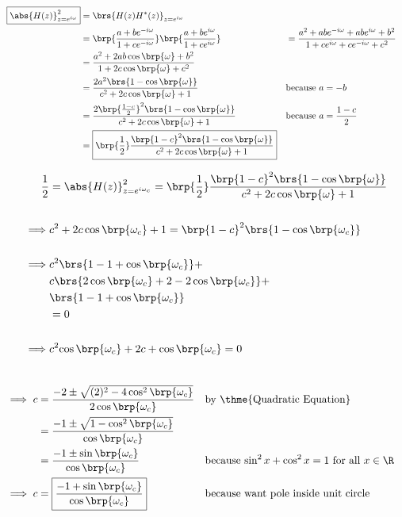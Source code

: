 %
\begin{align*}
  \boxed{\abs{H(z)}^2_{z=e^{i\omega}}}
    &= \brs{H(z)H^\ast(z)}_{z=e^{i\omega}}
  \\&= \brp{\frac{a + be^{-i\omega}}{1 + ce^{-i\omega}}}
       \brp{\frac{a + be^{i\omega}}{1 + ce^{i\omega}}}
   &&= \frac{a^2 + abe^{-i\omega} + abe^{i\omega} + b^2}
            {1   +  ce^{i\omega} +  ce^{-i\omega} + c^2}
  \\&= \frac{a^2 + 2ab\cos\brp{\omega} + b^2}
            {1   + 2 c\cos\brp{\omega} + c^2}
  \\&= \frac{2a^2\brs{1 -  \cos\brp{\omega}}}
            {c^2 + 2 c\cos\brp{\omega} + 1}
    && \text{because $a=-b$}
  \\&= \frac{2\brp{\frac{1-c}{2}}^2\brs{1 -  \cos\brp{\omega}}}
            {c^2 + 2 c\cos\brp{\omega} + 1}
    && \text{because $a=\frac{1-c}{2}$}
  \\&= \boxed{\brp{\frac{1}{2}}
              \frac{\brp{1-c}^2\brs{1 -  \cos\brp{\omega}}}
                   {c^2 + 2 c\cos\brp{\omega} + 1}
             }
\end{align*}

{\begin{align*}
  \frac{1}{2}
    &= \abs{H(z)}^2_{z=e^{i\omega_c}}
     = \brp{\frac{1}{2}}
       \frac{\brp{1-c}^2\brs{1 -  \cos\brp{\omega}}}
            {c^2 + 2 c\cos\brp{\omega} + 1}
  \\\\\implies &c^2 + 2 c\cos\brp{\omega_c} + 1 
             = \brp{1-c}^2\brs{1 -  \cos\brp{\omega_c}}
  \\\\\implies & c^2\brs{1-1+\cos\brp{\omega_c}} + 
             \\& c  \brs{2\cos\brp{\omega_c}+2-2\cos\brp{\omega_c}} +
             \\&    \brs{1-1+\cos\brp{\omega_c}}
             \\&= 0
  \\\\\implies & c^2{\cos\brp{\omega_c}} 
             + 2c 
             +    \cos\brp{\omega_c}
             = 0
\end{align*}}



{\begin{align*}
  \\\implies c &= \frac{-2 \pm \sqrt{(2)^2 -4\cos^2\brp{\omega_c}}}
                       {2\cos\brp{\omega_c}}
               && \text{by \thme{Quadratic Equation}}
             \\&= \frac{-1 \pm \sqrt{1 -\cos^2\brp{\omega_c}}}
                       {\cos\brp{\omega_c}}
             \\&= \frac{-1 \pm \sin\brp{\omega_c}}
                       {\cos\brp{\omega_c}}
               && \text{because $\sin^2x + \cos^2x = 1$ for all $x\in\R$}
  \\\implies c &=
      \boxed{\frac{-1 + \sin\brp{\omega_c}}
                    {\cos\brp{\omega_c}}}
               && \text{because want pole inside unit circle}
\end{align*}}


